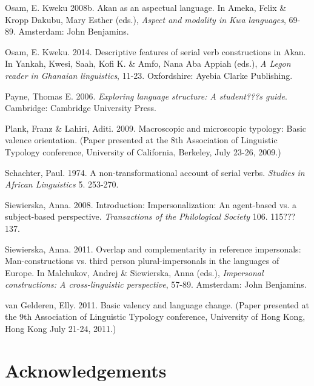 \documentclass[output=paper]{langsci/langscibook}
\begin{document}
Osam, E. Kweku 2008b. Akan as an aspectual language. In Ameka, Felix \& Kropp Dakubu, Mary Esther (eds.), \textit{Aspect and modality in Kwa languages}, 69-89. Amsterdam: John Benjamins.

Osam, E. Kweku. 2014. Descriptive features of serial verb constructions in Akan. In Yankah, Kwesi, Saah, Kofi K. \& Amfo, Nana Aba Appiah (eds.), \textit{A Legon reader in Ghanaian linguistics}, 11-23. Oxfordshire: Ayebia Clarke Publishing.

Payne, Thomas E. 2006. \textit{Exploring language structure: A student???s guide}. Cambridge: Cambridge University Press.

Plank, Franz \& Lahiri, Aditi. 2009. Macroscopic and microscopic typology: Basic valence orientation. (Paper presented at the 8th Association of Linguistic Typology conference, University of California, Berkeley, July 23-26, 2009.)

Schachter, Paul. 1974. A non-transformational account of serial verbs. \textit{Studies in African Linguistics} 5. 253-270.

Siewierska, Anna. 2008. Introduction: Impersonalization: An agent-based vs. a subject-based perspective. \textit{Transactions of the Philological Society} 106. 115???137.

Siewierska, Anna. 2011. Overlap and complementarity in reference impersonals: Man-constructions vs. third person plural-impersonals in the languages of Europe. In Malchukov, Andrej \& Siewierska, Anna (eds.), \textit{Impersonal constructions: A cross-linguistic perspective}, 57-89. Amsterdam: John Benjamins.

van Gelderen, Elly. 2011. Basic valency and language change. (Paper presented at the 9th Association of Linguistic Typology conference, University of Hong Kong, Hong Kong July 21-24, 2011.)


\section*{Acknowledgements}

{\sloppy
\printbibliography[heading=subbibliography,notkeyword=this]
}
\end{document}
